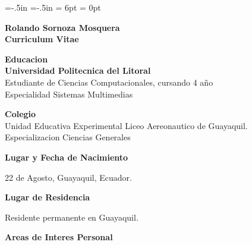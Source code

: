 
\voffset=-.5in
\hoffset=-.5in
\setlength{\textwidth}{6.5in}
\setlength{\textheight}{8.5in}
\parskip= 6pt
\parindent= 0pt


 
 \begin{center}
 \bf Rolando Sornoza Mosquera\\
 \bf Curriculum Vitae
 \end{center}


{\bf Educacion}\\
\hspace{.3in} {\bf Universidad Politecnica del Litoral}  \\
\hspace{.6in} Estudiante de Ciencias Computacionales, cursando 4 a\~{n}o\\
\hspace{.6in} Especialidad Sistemas Multimedias

 
\hspace{.3in} {\bf Colegio}\\
\hspace{.6in} Unidad Educativa Experimental Liceo Aereonautico de Guayaquil.\\
\hspace{.6in} Especializacion Ciencias Generales

 
 {\bf Lugar y Fecha de Nacimiento}

\hspace{.3in}22 de Agosto, Guayaquil, Ecuador.

{\bf Lugar de Residencia}

\hspace{.3in}Residente permanente en Guayaquil.

{\bf Areas de Interes Personal}

